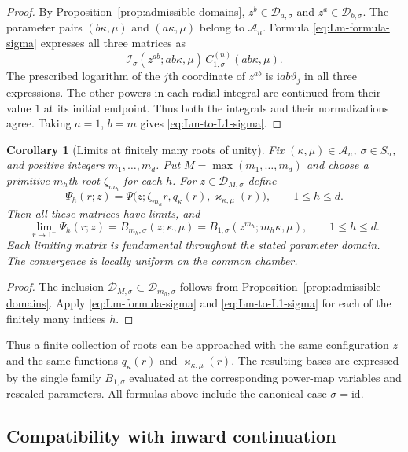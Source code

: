 \documentclass[12pt]{amsart}
\newtheorem{cor}[thm]{Corollary}
\theoremstyle{definition}
\numberwithin{equation}{section}
\theoremstyle{definition}
\let\mc\mathcal
\let\ka\kappa
\let\si\sigma
\let\le\leqslant
\def\beq{\begin{equation}}
\def\eeq{\end{equation}}
\begin{document}
\begin{proof}
By Proposition~\ref{prop:admissible-domains},
$z^b\in\mc D_{a,\si}$ and $z^a\in\mc D_{b,\si}$.
The parameter pairs $(b\ka,\mu)$ and $(a\ka,\mu)$ belong to
$\mc A_n$. Formula \eqref{eq:Lm-formula-sigma} expresses all
three matrices as
\[
 \mc I_\si(z^{ab};ab\ka,\mu)\,
                    C_{1,\si}^{(n)}(ab\ka,\mu).
\]
The prescribed logarithm of the $j$th coordinate of $z^{ab}$
is $\mathrm{i}ab\vartheta_j$ in all three expressions.
The other powers in each radial integral are continued from
their value $1$ at its initial endpoint. Thus both the integrals
and their normalizations agree. Taking $a=1$, $b=m$ gives
\eqref{eq:Lm-to-L1-sigma}.
\end{proof}

\begin{cor}[Limits at finitely many roots of unity]
\label{cor:finite-roots}
Fix $(\ka,\mu)\in\mc A_n$, $\si\in S_n$, and positive integers
$m_1,\ldots,m_d$. Put $M=\max(m_1,\ldots,m_d)$ and choose a
primitive $m_h$th root $\zeta_{m_h}$ for each $h$.
For $z\in\mc D_{M,\si}$ define
\beq\label{eq:finite-roots-matrices}
 \Psi_h(r;z)=
 \Psi\bigl(z;\zeta_{m_h}r,q_\ka(r),\varkappa_{\ka,\mu}(r)\bigr),
 \qquad 1\le h\le d.
\eeq
Then all these matrices have limits, and
\beq\label{eq:finite-roots-sigma}
 \lim_{r\to1^-}\Psi_h(r;z)
 =B_{m_h,\si}(z;\ka,\mu)
 =B_{1,\si}(z^{m_h};m_h\ka,\mu),
 \qquad 1\le h\le d.
\eeq
Each limiting matrix is fundamental throughout the stated
parameter domain. The convergence is locally uniform on the
common chamber.
\end{cor}

\begin{proof}
The inclusion
$\mc D_{M,\si}\subset\mc D_{m_h,\si}$ follows from
Proposition~\ref{prop:admissible-domains}. Apply
\eqref{eq:Lm-formula-sigma} and \eqref{eq:Lm-to-L1-sigma}
for each of the finitely many indices $h$.
\end{proof}

Thus a finite collection of roots can be approached with the same
configuration $z$ and the same functions $q_\ka(r)$ and
$\varkappa_{\ka,\mu}(r)$. The resulting bases are expressed by
the single family $B_{1,\si}$ evaluated at the corresponding
power-map variables and rescaled parameters. All formulas above
include the canonical case $\si=\mathrm{id}$.

\subsection{Compatibility with inward continuation}
\label{subsec:functorial-continuation}
\end{document}
